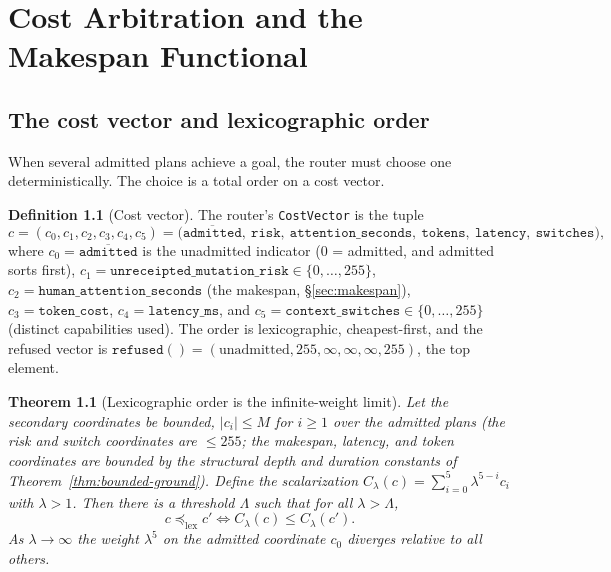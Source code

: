 \documentclass[11pt,oneside]{book}
\theoremstyle{definition}
\newtheorem{definition}{Definition}[chapter]
\theoremstyle{plain}
\newtheorem{theorem}{Theorem}[chapter]
\theoremstyle{remark}
\newcommand{\CostV}{c}                     %
\newcommand{\code}[1]{\texttt{#1}}
\begin{document}
\chapter{Cost Arbitration and the Makespan Functional}
\label{ch:cost}

\section{The cost vector and lexicographic order}

When several admitted plans achieve a goal, the router must choose one deterministically. The
choice is a total order on a cost vector.

\begin{definition}[Cost vector]\label{def:cost}
The router's \code{CostVector} is the tuple
\[
\CostV=(c_0,c_1,c_2,c_3,c_4,c_5)=
\bigl(\overline{\code{admitted}},\ \code{risk},\ \code{attention\_seconds},\ \code{tokens},\
\code{latency},\ \code{switches}\bigr),
\]
where $c_0=\overline{\code{admitted}}$ is the unadmitted indicator ($0$ = admitted, and
admitted sorts first), $c_1=\code{unreceipted\_mutation\_risk}\in\{0,\dots,255\}$,
$c_2=\code{human\_attention\_seconds}$ (the makespan, \S\ref{sec:makespan}),
$c_3=\code{token\_cost}$, $c_4=\code{latency\_ms}$, and
$c_5=\code{context\_switches}\in\{0,\dots,255\}$ (distinct capabilities used). The order is
lexicographic, cheapest-first, and the refused vector is
$\code{refused}()=(\text{unadmitted},255,\infty,\infty,\infty,255)$, the top element.
\end{definition}

\begin{theorem}[Lexicographic order is the infinite-weight limit]\label{thm:lex}
Let the secondary coordinates be bounded, $|c_i|\le M$ for $i\ge 1$ over the admitted plans
(the risk and switch coordinates are $\le 255$; the makespan, latency, and token coordinates
are bounded by the structural depth and duration constants of
Theorem~\ref{thm:bounded-ground}). Define the scalarization
$C_\lambda(\CostV)=\sum_{i=0}^{5}\lambda^{5-i}c_i$ with $\lambda>1$. Then there is a threshold
$\Lambda$ such that for all $\lambda>\Lambda$,
\[
\CostV\preceq_{\mathrm{lex}}\CostV' \iff C_\lambda(\CostV)\le C_\lambda(\CostV').
\]
As $\lambda\to\infty$ the weight $\lambda^{5}$ on the admitted coordinate $c_0$ diverges
relative to all others.
\end{theorem}
\end{document}
